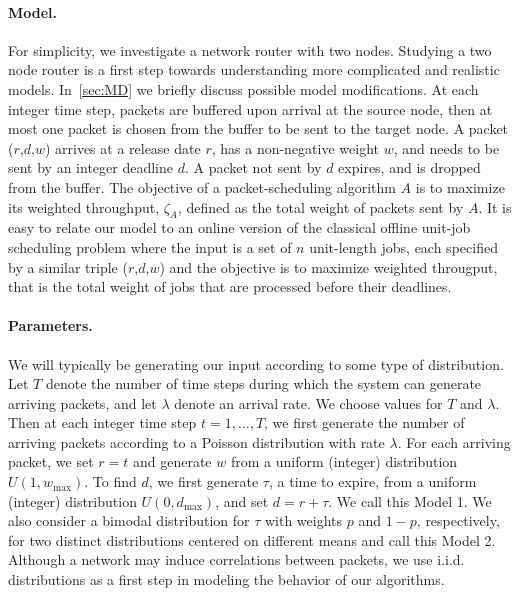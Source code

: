 \documentclass[oribibl]{llncs}
\begin{document}
\paragraph {Model.} For simplicity, we investigate a network router with
two nodes.   Studying a two node router is a first step towards understanding
more complicated and realistic models.
In~\ref{sec:MD} we briefly discuss possible model
modifications. At each integer time step, packets are buffered upon
arrival at the source node, then at most one packet is chosen from the
buffer to be sent to the target node. A packet ($r$,$d$,$w$) arrives
at a release date $r$, has a non-negative weight $w$, and needs to be
sent by an integer deadline $d$. A packet not sent by $d$ expires, and
is dropped from the buffer.  The objective of a packet-scheduling
algorithm $A$ is to maximize its weighted throughput, $\zeta_A$,
defined as the total weight of packets sent by $A$. It is easy to
relate our model to an online version of the classical offline  unit-job
scheduling problem where the input is a set of
$n$ unit-length jobs, each specified by a similar triple ($r$,$d$,$w$)
and the objective is to maximize weighted througput, that is the total weight 
of jobs that are processed before their deadlines.


\paragraph {Parameters.} 
We will typically be generating our input according to some type of
distribution. Let $T$ denote the number of time steps during which
the system can generate arriving packets, and let $\lambda$ denote an
arrival rate. We choose values for $T$ and $\lambda$. Then at 
each integer time step $t=1,\ldots,T$, we first
generate the number of arriving packets according to a Poisson
distribution with rate $\lambda$. For each arriving packet, we set
$r=t$ and generate $w$ from a uniform (integer) distribution
$U(1,w_{\max})$. To find $d$, we first generate
$\tau$, a time to expire, from a uniform (integer) distribution $U(0,d_{\max})$,
and set $d=r+\tau$. We call this Model 1. We also consider a bimodal distribution for $\tau$ with
weights $p$ and $1-p$, respectively, for two distinct distributions
centered on different means and call this Model 2. Although a network
may induce correlations between packets,  we use i.i.d. distributions as a first
step in modeling the behavior of our algorithms. 
\end{document}
